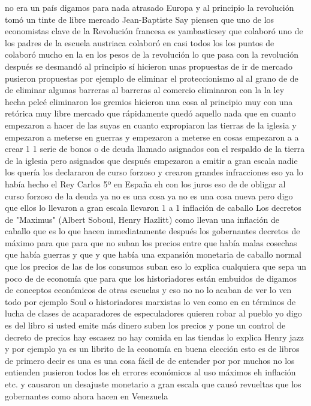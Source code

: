 no era un país digamos para nada atrasado Europa y al principio la revolución tomó un tinte de libre mercado
Jean-Baptiste Say
piensen que uno de los economistas clave de la Revolución francesa es yambasticsey que colaboró uno de los padres de la escuela austriaca
colaboró en casi todos los los puntos de colaboró mucho en la en los pesos de la revolución lo que pasa con la revolución después se desmandó
al principio sí hicieron unas propuestas de ir de mercado pusieron propuestas por ejemplo de eliminar
el proteccionismo al al grano de de de eliminar algunas barreras al barreras al comercio
eliminaron con la la ley hecha peleé eliminaron los gremios hicieron una cosa al principio muy con una retórica
muy libre mercado que rápidamente quedó aquello nada que en cuanto empezaron a hacer de las suyas en cuanto expropiaron las tierras de la iglesia
y empezaron a meterse en guerras y empezaron a meterse en cosas empezaron a a crear 1 1 serie de bonos o de deuda
llamado asignados con el respaldo de la tierra de la iglesia pero asignados que después
empezaron a emitir a gran escala nadie los quería los declararon de curso forzoso y crearon grandes infracciones
eso ya lo había hecho el Rey Carlos 5º en España eh con los juros eso de de obligar al curso forzoso de la deuda
ya no es una cosa ya no es una cosa nueva pero digo que ellos lo llevaron a gran escala llevaron 1 a 1 inflación de caballo
Los decretos de "Maximus" (Albert Soboul, Henry Hazlitt)
como llevan una inflación de caballo que es lo que hacen inmediatamente después los gobernantes decretos de máximo para que para que no suban los precios
entre que había malas cosechas que había guerras y que y que había una expansión monetaria de caballo normal que los precios de las de los consumos suban
eso lo explica cualquiera que sepa un poco de de economía que para que los historiadores están embuidos de digamos de conceptos económicos de otras escuelas
y eso no no lo acaban de ver lo ven todo por ejemplo Soul o historiadores marxistas lo ven como en en términos de lucha de clases
de acaparadores de especuladores quieren robar al pueblo yo digo es del libro si usted emite más dinero
suben los precios y pone un control de decreto de precios hay escasez no hay comida en las tiendas lo explica Henry jazz
y por ejemplo ya es un librito de la economía en buena elección esto es de libros de primero decir es una
es una cosa fácil de de entender por por muchos no los entienden pusieron todos los eh errores económicos
al uso máximos eh inflación etc. y causaron un desajuste monetario a gran escala
que causó revueltas que los gobernantes como ahora hacen en Venezuela
